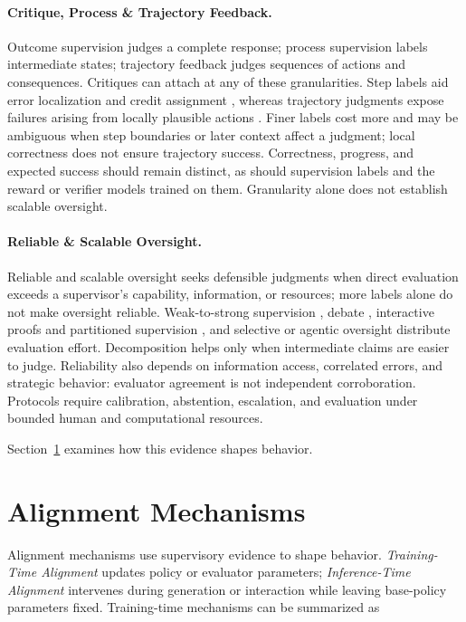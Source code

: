 \documentclass[11pt]{article}
\begin{document}
\paragraph{Critique, Process \& Trajectory Feedback.}
Outcome supervision judges a complete response; process supervision labels intermediate states; trajectory feedback judges sequences of actions and consequences. Critiques can attach at any of these granularities. Step labels aid error localization and credit assignment \citep{lightman2024verify,setlur2025rewarding}, whereas trajectory judgments expose failures arising from locally plausible actions \citep{xie2025ctrl,fan2026agentrrm}. Finer labels cost more and may be ambiguous when step boundaries or later context affect a judgment; local correctness does not ensure trajectory success. Correctness, progress, and expected success should remain distinct, as should supervision labels and the reward or verifier models trained on them. Granularity alone does not establish scalable oversight.

\paragraph{Reliable \& Scalable Oversight.}
Reliable and scalable oversight seeks defensible judgments when direct evaluation exceeds a supervisor's capability, information, or resources; more labels alone do not make oversight reliable. Weak-to-strong supervision \citep{burns2024weakstrong}, debate \citep{khan2024debate,lang2025debate}, interactive proofs and partitioned supervision \citep{hammond2025neuralproofs,yin2026partitioned}, and selective or agentic oversight \citep{lang2026selective,ranaldi2026agentic} distribute evaluation effort. Decomposition helps only when intermediate claims are easier to judge. Reliability also depends on information access, correlated errors, and strategic behavior: evaluator agreement is not independent corroboration. Protocols require calibration, abstention, escalation, and evaluation under bounded human and computational resources.

Section~\ref{sec:alignment-mechanisms} examines how this evidence shapes behavior.




\section{Alignment Mechanisms}
\label{sec:alignment-mechanisms}

Alignment mechanisms use supervisory evidence to shape behavior. \emph{Training-Time Alignment} updates policy or evaluator parameters; \emph{Inference-Time Alignment} intervenes during generation or interaction while leaving base-policy parameters fixed. Training-time mechanisms can be summarized as
\end{document}
